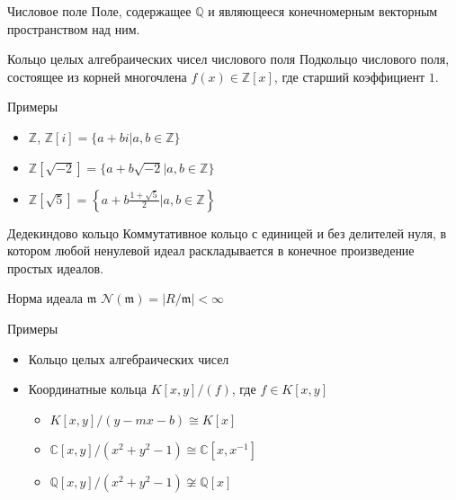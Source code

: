 \documentclass[8pt, xcolor=x11names]{beamer}
\begin{document}
\begin{frame}
    \begin{block}{Числовое поле}
        Поле, содержащее $\mathbb{Q}$ и являющееся конечномерным векторным пространством над ним.
    \end{block}

    \begin{block}{Кольцо целых алгебраических чисел числового поля}
        Подкольцо числового поля, состоящее из корней многочлена $f(x) \in \mathbb{Z}[x]$, где старший коэффициент $1$.
    \end{block}
    
    \begin{block}{Примеры}
        \begin{itemize}
            \item $\mathbb{Z}$, $\mathbb{Z}[i] = \{a + bi | a, b\in\mathbb{Z}\}$
            \item $\mathbb{Z}[\sqrt{-2}] = \{a + b\sqrt{-2} | a, b\in\mathbb{Z}\}$
            \item $\mathbb{Z}[\sqrt{5}] = \left\{a + b\frac{1+\sqrt{5}}{2} | a, b\in\mathbb{Z}\right\}$
        \end{itemize}
    \end{block}
\end{frame}

\begin{frame}
    \begin{block}{Дедекиндово кольцо}
        Коммутативное кольцо с единицей и без делителей нуля, в котором любой ненулевой идеал раскладывается в конечное произведение простых идеалов.
    \end{block}

    \begin{block}{Норма идеала $\mathfrak{m}$}
        $\mathcal{N}(\mathfrak{m}) = |R/\mathfrak{m}| < \infty$
    \end{block}

    \begin{block}{Примеры}
        \begin{itemize}
            \item Кольцо целых алгебраических чисел
            
            \item Координатные кольца $K[x, y]/(f)$, где $f \in K[x, y]$
            \begin{itemize}
                \item $K[x, y]/(y - mx - b) \cong K[x]$
                \item $\mathbb{C}[x, y]/(x^2 + y^2 - 1) \cong \mathbb{C}[x, x^{-1}]$
                \item $\mathbb{Q}[x, y]/(x^2 + y^2 - 1) \not\cong \mathbb{Q}[x]$
            \end{itemize}
        \end{itemize}
    \end{block}
\end{frame}
\end{document}
